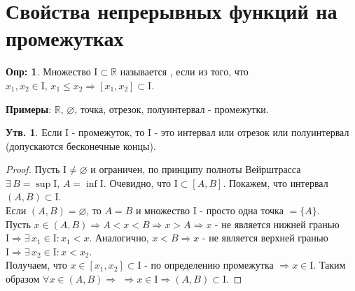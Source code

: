 \documentclass[12pt]{article}
\newcommand{\MR}{\mathbb{R}}
\newcommand{\MI}{\mathrm{I}}
\newcommand{\VN}{\varnothing}
\theoremstyle{definition}
\newtheorem{defn}{Опр:}
\newtheorem{prop}{Утв.}
\begin{document}

\section*{Свойства непрерывных функций на промежутках}

\begin{defn}
	Множество $\MI \subset \MR$ называется , если из того, что $x_1, x_2 \in \MI, \, x_1 \leq x_2 \Rightarrow [x_1,x_2] \subset \MI$.
\end{defn}

\textbf{Примеры}: $\MR, \, \VN$, точка, отрезок, полуинтервал - промежутки.

\begin{prop}
	Если $\MI$ - промежуток, то $\MI$ - это интервал или отрезок или полуинтервал (допускаются бесконечные концы).
\end{prop}

\begin{proof}
	Пусть $\MI \neq \VN$ и ограничен, по принципу полноты Вейрштрасса $\exists \, B = \sup{\MI}, \, A = \inf{\MI}$. Очевидно, что $\MI \subset [A,B]$. Покажем, что интервал $(A,B) \subset \MI$. \\
	Если $(A,B) = \VN$, то $A = B$ и множество $\MI$ - просто одна точка $= \{A\}$.\\
	Пусть $x \in (A,B) \Rightarrow A < x < B \Rightarrow x > A \Rightarrow x$ - не является нижней гранью $\MI \Rightarrow \exists \, x_1 \in \MI \colon x_1 < x$. Аналогично, $x < B \Rightarrow x$ - не является верхней гранью  $\MI \Rightarrow \exists \, x_2 \in \MI \colon x < x_2$. \\
	Получаем, что $x \in [x_1,x_2] \subset \MI$ - по определению промежутка $\Rightarrow x \in \MI$. Таким образом $\forall x \in (A,B) \Rightarrow$ $\Rightarrow x \in \MI \Rightarrow (A,B) \subset \MI$.
\end{proof}
\end{document}
